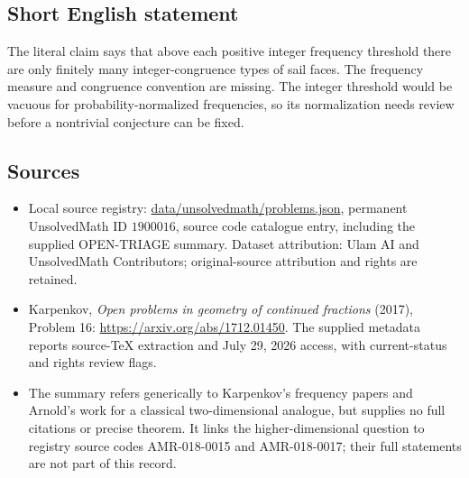 \documentclass[11pt]{article}
\begin{document}
\subsection{Short English statement}
The literal claim says that above each positive integer frequency threshold there are only finitely many integer-congruence types of sail faces. The frequency measure and congruence convention are missing. The integer threshold would be vacuous for probability-normalized frequencies, so its normalization needs review before a nontrivial conjecture can be fixed.
\subsection{Sources}
\begin{itemize}
\item Local source registry: \url{data/unsolvedmath/problems.json}, permanent UnsolvedMath ID $1900016$, source code catalogue entry, including the supplied OPEN-TRIAGE summary. Dataset attribution: Ulam AI and UnsolvedMath Contributors; original-source attribution and rights are retained.
\item Karpenkov, \emph{Open problems in geometry of continued fractions} (2017), Problem 16: \url{https://arxiv.org/abs/1712.01450}. The supplied metadata reports source-TeX extraction and July 29, 2026 access, with current-status and rights review flags.
\item The summary refers generically to Karpenkov's frequency papers and Arnold's work for a classical two-dimensional analogue, but supplies no full citations or precise theorem. It links the higher-dimensional question to registry source codes AMR-018-0015 and AMR-018-0017; their full statements are not part of this record.
\end{itemize}
\end{document}
